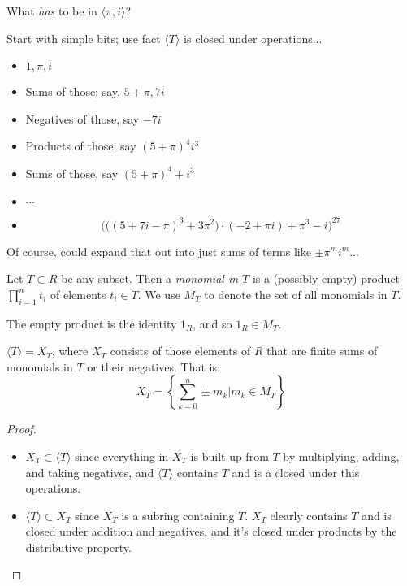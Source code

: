 \documentclass{beamer}
\begin{document}
\begin{frame}{What \emph{has} to be in $\langle \pi, i \rangle $?}

Start with simple bits; use fact $\langle T \rangle$ is closed under operations...
\begin{itemize}
\item $1, \pi, i$
\item Sums of those; say, $5+\pi, 7i$
\item Negatives of those, say $-7i$ 
\item Products of those, say $(5+\pi)^4 i^3$
\item Sums of those, say $(5+\pi)^4+i^3$
\item $\cdots$
\item $$\Big(\big((5+7i-\pi)^3+3\pi^2\big)\cdot (-2+\pi i)+\pi^3-i\Big)^{27}$$
\end{itemize}
Of course, could expand that out into just sums of terms like $\pm\pi^m i^m$...

\end{frame}

\begin{frame}

\begin{definition} Let $T\subset R$ be any subset.  Then a \emph{monomial in $T$} is a (possibly empty) product $\prod_{i=1}^n t_i$ of elements $t_i\in T$.  We use $M_T$ to denote the set of all monomials in $T$.
\end{definition}

The empty product is the identity $1_R$, and so $1_R\in M_T$.
\end{frame}


\begin{frame}

\begin{lemma} $\langle T\rangle=X_T$, where $X_T$ consists of those elements of $R$ that are finite sums of monomials in $T$ or their negatives.  That is: 
$$X_T=\left\{\sum_{k=0}^n \pm m_k \Big| m_k\in M_T\right\}$$

\end{lemma}

\begin{proof} 
\begin{itemize}
\item $X_T\subset \langle T\rangle$ since  everything in $X_T$ is built up from $T$ by multiplying, adding, and taking negatives, and $\langle T\rangle $ contains $T$ and is a closed under this operations.

\item $\langle T\rangle \subset X_T$ since $X_T$ is a subring containing $T$. $X_T$ clearly contains $T$ and is closed under addition and negatives, and it's closed under products by the distributive property.
\end{itemize}
\end{proof}

\end{frame}
\end{document}

